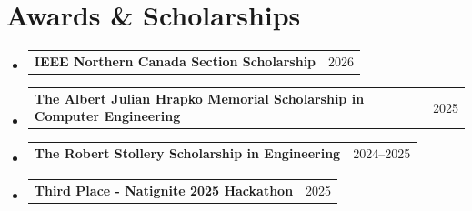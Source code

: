 \documentclass[letterpaper,11pt]{article}
\makeatletter
\newcommand{\resumeAward}[2]{
  \item
  \begin{tabular*}{0.97\textwidth}{l@{\extracolsep{\fill}}r}
    \small #1 & \small #2 \\
  \end{tabular*}\vspace{-6pt}
}
\newcommand{\resumeSubHeadingListStart}{\begin{itemize}[leftmargin=0.15in, label={}]}
\newcommand{\resumeSubHeadingListEnd}{\end{itemize}\vspace{-1pt}}
\makeatother
\begin{document}
\section{Awards \& Scholarships}
  \resumeSubHeadingListStart
    \resumeAward{\textbf{IEEE Northern Canada Section Scholarship}}{2026}
    \resumeAward{\textbf{The Albert Julian Hrapko Memorial Scholarship in Computer Engineering}}{2025}
    \resumeAward{\textbf{The Robert Stollery Scholarship in Engineering}}{2024--2025}
    \resumeAward{\textbf{Third Place - Natignite 2025 Hackathon}}{2025}
  \resumeSubHeadingListEnd
\end{document}
